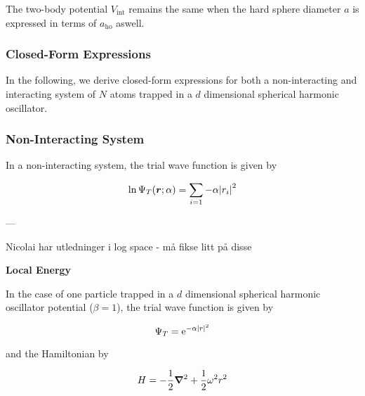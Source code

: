 The two-body potential $V_{\mathrm{int}}$ remains the same when the hard sphere diameter $a$ is expressed in terms of $a_{\mathrm{ho}}$ aswell. 



\subsubsection{Closed-Form Expressions}

In the following, we derive closed-form expressions for both a non-interacting and interacting system of $N$ atoms trapped in a $d$ dimensional spherical harmonic oscillator. 

\subsubsection*{Non-Interacting System}

In a non-interacting system, the trial wave function is given by 

\begin{equation*}
    \ln \Psi_T \qty(\bm{r}; \alpha) = \sum_{i=1} -\alpha \abs{r_i}^2
\end{equation*}

---

Nicolai har utledninger i log space - må fikse litt på disse


\textbf{Local Energy}

In the case of one particle trapped in a $d$ dimensional spherical harmonic oscillator potential ($\beta = 1$), the trial wave function is given by 

\begin{equation*}
    \Psi_T = \mathrm{e}^{-\alpha \abs{r}^2}
\end{equation*}

and the Hamiltonian by

\begin{equation*}
    H = - \frac{1}{2} \grad^2 + \frac{1}{2} \omega^2 r^2
\end{equation*}

